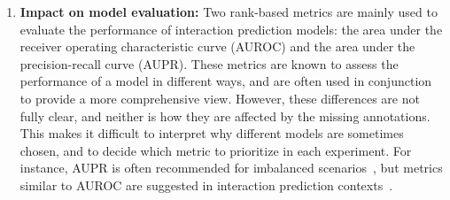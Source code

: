\begin{enumerate}
    \item \textbf{Impact on model evaluation:} Two rank-based metrics are mainly used to evaluate the performance of interaction prediction models: the area under the receiver operating characteristic curve (AUROC) and the area under the precision-recall curve (AUPR). These metrics are known to assess the performance of a model in different ways, and are often used in conjunction to provide a more comprehensive view.
    However, these differences are not fully clear, and neither is how they are affected by the missing annotations.
    This makes it difficult to interpret why different models are sometimes chosen,
    and to decide which metric to prioritize in each experiment. For instance, AUPR is often recommended for imbalanced scenarios~\cite{}, but metrics similar to AUROC are suggested in interaction prediction contexts~\cite{pahikkala2015more,johnsonlogistic}.
\end{enumerate}


